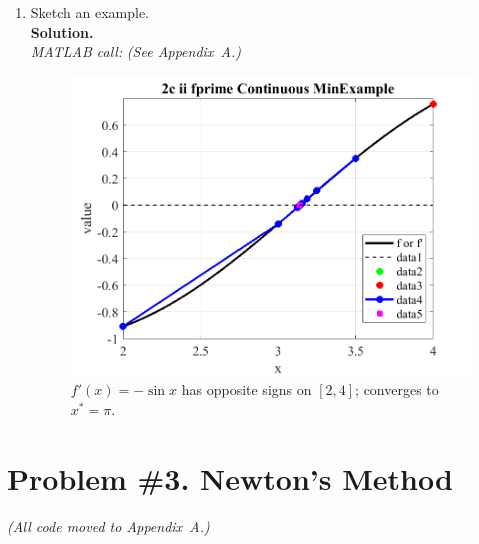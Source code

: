 \documentclass[11pt]{article}
\begin{document}
\begin{enumerate}[label=\textbf{\arabic*)}, leftmargin=2.2em]
\begin{enumerate}[label=\roman*)]
			\item Sketch an example.\\
			\textbf{Solution.}\\
			\textit{MATLAB call:} \emph{(See Appendix~A.)}
			
			\begin{figure}[H]\centering
				\includegraphics[width=0.78\linewidth]{plots/2c_ii_fprime_Continuous_MinExample.png}
				\caption{$f'(x)=-\sin x$ has opposite signs on $[2,4]$; converges to $x^*=\pi$.}
			\end{figure}
			
		\end{enumerate}
		
	\end{enumerate}
	
	\newpage
	\section*{Problem \#3. Newton’s Method}
	
	\emph{(All code moved to Appendix~A.)}
	
\end{document}
